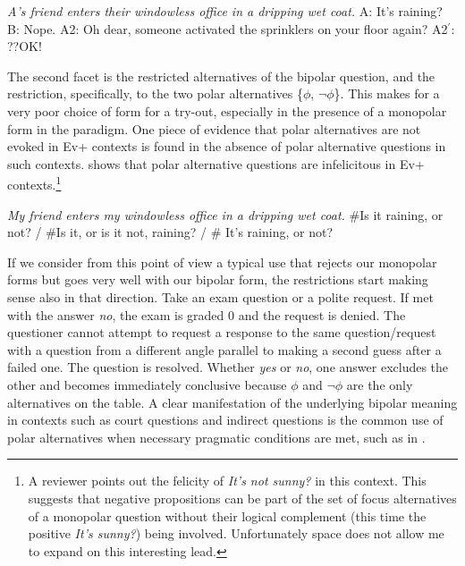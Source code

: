\documentclass[output=paper,colorlinks,citecolor=brown]{langscibook}
\begin{document}
\ea\label{sprinklers} \textit{A's friend enters their windowless office in a dripping wet coat.}
\ea \label{sprinklers:a} A: It's raining?
\ex B: Nope.
\ex \label{sprinklers:c} A2: Oh dear, someone activated the sprinklers on your floor again?
\ex \label{sprinklers:a:bar}  A2$^\prime$: ??OK!
\z 
\z
  
The second facet is the restricted alternatives of the bipolar question, and the restriction, specifically, to the two polar alternatives \{$\phi$, $\neg\phi$\}. This makes for a very poor choice of form for a try-out, especially in the presence of a monopolar form in the paradigm. One piece of evidence that polar alternatives are not evoked in Ev+ contexts is found in the absence of polar alternative questions in such contexts.  shows that polar alternative questions are infelicitous in Ev+ contexts.\footnote{A reviewer points out the felicity of \textit{It's not sunny?} in this context. This suggests that negative propositions can be part of the set of focus alternatives of a monopolar question without their logical complement (this time the positive \textit{It's sunny?}) being involved. Unfortunately space does not allow me to expand on this interesting lead.}

\ea  \textit{My friend enters my windowless office in a dripping wet coat.}\label{raining}
\sn \#Is it raining, or not? / \#Is it, or is it not, raining? / \# It's raining, or not?
\z
  
  If we consider from this point of view a typical use that rejects our monopolar forms but goes very well with our bipolar form, the restrictions start making sense also in that direction. Take an exam question or a polite request. If met with the answer \textit{no}, the exam is graded 0 and the request is denied. The questioner cannot attempt to request a response to the same question/request with a question from a different angle parallel to making a second guess after a failed one. The question is resolved. Whether \textit{yes} or \textit{no}, one answer excludes the other and becomes immediately conclusive because $\phi$ and $\neg\phi$ are the only alternatives on the table. A clear manifestation of the underlying bipolar meaning in contexts such as court questions and indirect questions is the common use of polar alternatives when necessary pragmatic conditions are met, such as in .  
  
\end{document}
